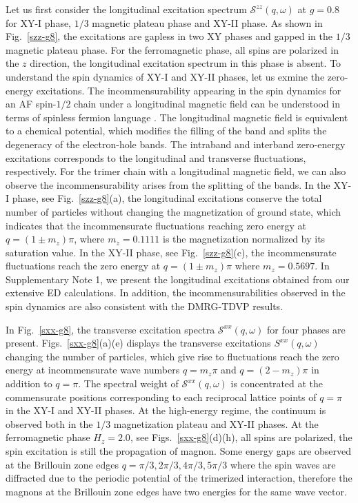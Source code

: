 \documentclass[aps,prx,showpacs,floatfix,twocolumn,superscriptaddress,nofootinbib,longbibliography]{revtex4-2}
\begin{document}
Let us first consider the longitudinal excitation spectrum $\mathcal{S}^{zz}  (q,\omega) $ at  $g=0.8$ for XY-I phase, $1/3$ magnetic plateau phase and XY-II phase. As shown in Fig.~\ref{szz-g8},  the excitations are gapless in  two XY phases and gapped in the $1/3$ magnetic plateau phase. For the ferromagnetic phase, all spins are polarized in the $z$ direction, the longitudinal excitation spectrum in this phase is absent. To understand the spin dynamics of XY-I and XY-II phases, let us exmine the zero-energy excitations. 
The incommensurability appearing in the spin dynamics for an AF spin-$1/2$ chain under a longitudinal magnetic field can be understood in terms of spinless fermion language \cite{takayoshi2023phase}. The longitudinal magnetic field is equivalent to a chemical potential, which modifies the filling of the band and splits the degeneracy of the electron-hole bands. The intraband and interband zero-energy excitations  corresponds to the longitudinal and transverse fluctuations, respectively. 
For the trimer chain with a longitudinal magnetic field, we can also observe the  incommensurability arises from the splitting of the bands. In the XY-I phase, see Fig.~\ref{szz-g8}(a), the 
longitudinal excitations conserve  the total number of particles without changing the magnetization of ground state, which indicates that the 
incommensurate fluctuations reaching zero energy at $q=(1\pm m_z)\pi$, where $m_z=0.1111$ is the 
magnetization normalized by its saturation value. In the XY-II phase, see Fig.~\ref{szz-g8}(c), the 
incommensurate fluctuations reach the zero energy at $q=(1\pm m_z)\pi$ where $m_z = 0.5697$. 
In Supplementary Note 1, we present the longitudinal excitations obtained from our extensive ED calculations. In addition,  the incommensurabilities observed in the spin dynamics are also consistent with the DMRG-TDVP results.

In Fig.~\ref{sxx-g8}, the transverse excitation spectra  $\mathcal{S}^{xx}  (q,\omega) $ for four phases are present. Figs.~\ref{sxx-g8}(a)(e) displays the transverse excitations $S^{xx}(q, \omega)$ changing the number of particles, which give rise to fluctuations reach the zero energy at incommensurate wave numbers $q=m_z \pi$ and $q=(2-m_z)\pi$ in addition to $q=\pi$. The spectral weight of $\mathcal{S}^{xx}  (q,\omega) $  is concentrated at the commensurate positions corresponding to each reciprocal lattice points of $q=\pi$ in the XY-I and XY-II phases.  At the high-energy regime, the continuum is observed both in the $1/3$ magnetization plateau and XY-II phases.  At the ferromagnetic phase $H_z=2.0$, see
Figs.~\ref{sxx-g8}(d)(h),  all spins are polarized,  the spin excitation is still the propagation of   magnon.  Some energy gaps are observed  at the   Brillouin zone  edges $q=\pi/3,2\pi/3,4\pi/3,5\pi/3 $ where the spin waves are diffracted due to the periodic potential of the trimerized interaction, therefore the magnons at the Brillouin zone edges  have two energies for the same wave vector.
\end{document}
